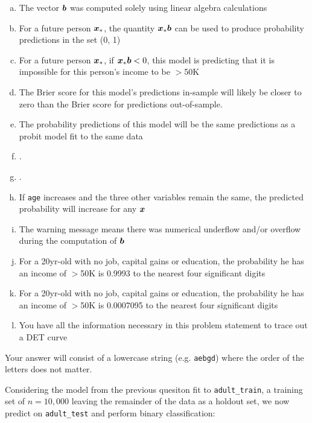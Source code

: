 \documentclass[12pt,landscape]{article}
\newcommand{\instr}{\small Your answer will consist of a lowercase string (e.g. \texttt{aebgd}) where the order of the letters does not matter. \normalsize}
\begin{document}
\begin{enumerate}[(a)]
\item The vector $\boldsymbol{b}$ was computed solely using linear algebra calculations
\item For a future person $\boldsymbol{x}_*$, the quantity $\boldsymbol{x}_*\boldsymbol{b}$ can be used to produce probability predictions in the set (0, 1)
\item For a future person $\boldsymbol{x}_*$, if $\boldsymbol{x}_*\boldsymbol{b} < 0$, this model is predicting that it is impossible for this person's income to be $>$50K
\item The Brier score for this model's predictions in-sample will likely be closer to zero than the Brier score for predictions out-of-sample.
\item The probability predictions of this model will be the same predictions as a probit model fit to the same data
\item {}.
\item {}.
\item If \texttt{age} increases and the three other variables remain the same, the predicted probability will increase for any $\boldsymbol{x}$
\item The warning message means there was numerical underflow and/or overflow during the computation of $\boldsymbol{b}$
\item For a 20yr-old with no job, capital gains or education, the probability he has an income of $>$50K is 0.9993 to the nearest four significant digits
\item For a 20yr-old with no job, capital gains or education, the probability he has an income of $>$50K is 0.0007095 to the nearest four significant digits
\item You have all the information necessary in this problem statement to trace out a DET curve
\end{enumerate}
\eenum\instr\pagebreak

\problem{}  Considering the model from the previous quesiton fit to \texttt{adult\_train}, a training set of $n=10,000$ leaving the remainder of the data as a holdout set, we now predict on \texttt{adult\_test} and perform binary classification:
\end{document}
